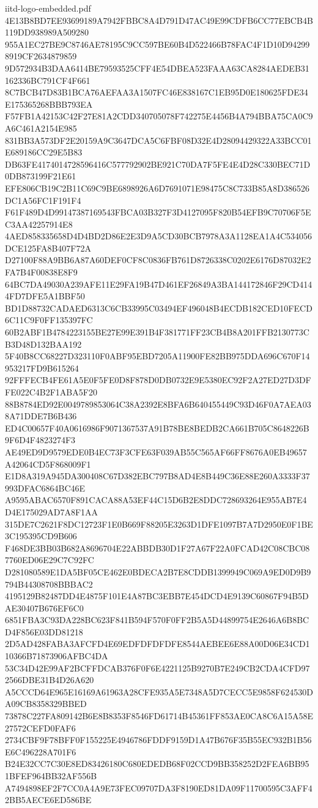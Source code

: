 \begin{filecontents*}[overwrite]{iitd-logo-embedded.pdf}
4E13B8BD7EE93699189A7942FBBC8A4D791D47AC49E99CDFB6CC77EBCB4B119DD938989A509280
955A1EC27BE9C8746AE78195C9CC597BE60B4D522466B78FAC4F1D10D942998919CF2634879859
9D572934B3DAA6414BE79593525CFF4E54DBEA523FAAA63CA8284AEDEB31162336BC791CF4F661
8C7BCB47D83B1BCA76AEFAA3A1507FC46E838167C1EB95D0E180625FDE34E175365268BBB793EA
F57FB1A42153C42F27E81A2CDD340705078F742275E4456B4A794BBA75CA0C9A6C461A2154E985
831BB3A573DF2E20159A9C3647DCA5C6FBF08D32E4D28094429322A33BCC01E689186CC29E5B83
DB63FE4174014728596416C577792902BE921C70DA7F5FE4E4D28C330BEC71D0DB873199F21E61
EFE806CB19C2B11C69C9BE6898926A6D7691071E98475C8C733B85A8D386526DC1A56FC1F191F4
F61F489D4D99147387169543FBCA03B327F3D4127095F820B54EFB9C70706F5EC3AA42257914E8
4AED858335658D4D4BD2D86E2E3D9A5CD30BCB7978A3A1128EA1A4C534056DCE125FA8B407F72A
D27100F88A9BB6A87A60DEF0CF8C0836FB761D8726338C0202E6176D87032E2FA7B4F00838E8F9
64BC7DA49030A239AFE11E29FA19B47D461EF26849A3BA144172846F29CD4144FD7DFE5A1BBF50
BD1D88732CADAED6313C6CB33995C03494EF496048B4ECDB182CED10FECD6C11C9F0FF135397FC
60B2ABF1B4784223155BE27E99E391B4F381771FF23CB4B8A201FFB2130773CB3D48D132BAA192
5F40B8CC68227D323110F0ABF95EBD7205A11900FE82BB975DDA696C670F14953217FD9B615264
92FFFECB4FE61A5E0F5FE0D8F878D0DB0732E9E5380EC92F2A27ED27D3DFFE022C4B2F1ABA5F20
88B8784ED92E0049789853064C38A2392E8BFA6B640455449C93D46F0A7AEA038A71DDE7B6B436
ED4C00657F40A0616986F9071367537A91B78BE8BEDB2CA661B705C8648226B9F6D4F4823274F3
AE49ED9D9579EDE0B4EC73F3CFE63F039AB55C565AF66FF8676A0EB49657A42064CD5F868009F1
E1D8A319A945DA300408C67D382EBC797B8AD4E8B449C36E88E260A3333F37993DFAC6864BC46E
A9595ABAC6570F891CACA88A53EF44C15D6B2E8DDC728693264E955AB7E4D4E175029AD7A8F1AA
315DE7C2621F8DC12723F1E0B669F88205E3263D1DFE1097B7A7D2950E0F1BE3C195395CD9B606
F468DE3BB03B682A8696704E22ABBDB30D1F27A67F22A0FCAD42C08CBC087760ED06E29C7C92FC
D281080589E1DA5BF05CE462E0BDECA2B7E8CDDB1399949C069A9ED0D9B9794B44308708BBBAC2
4195129B82487DD4E4875F101E4A87BC3EBB7E454DCD4E9139C60867F94B5DAE30407B676EF6C0
6851FBA3C93DA228BC623F841B594F570F0FF2B5A5D44899754E2646A6B8BCD4F856E03DD81218
2D5AD428FABA3AFCFD4E69EDFDFDFDFE8544AEBEE6E88A00D06E34CD110366B71873906AFBC4DA
53C34D42E99AF2BCFFDCAB376F0F6E4221125B9270B7E249CB2CDA4CFD972566DBE31B4D26A620
A5CCCD64E965E16169A61963A28CFE935A5E7348A5D7CECC5E9858F624530DA09CB8358329BBED
73878C227FA809142B6E8B8353F8546FD61714B45361FF853AE0CA8C6A15A58E27572CEFD0FAF6
2734CBF9F78BFF0F155225E4946786FDDF9159D1A47B676F35B55EC932B1B56E6C496228A701F6
B24E32CC7C30E8ED83426180C680EDEDB68F02CCD9BB358252D2FEA6BB951BFEF964BB32AF556B
A7494898EF2F7CC0A4A9E73FEC09707DA3F8190ED81DA09F11700595C3AFF42BB5AECE6ED586BE

\end{filecontents*}
